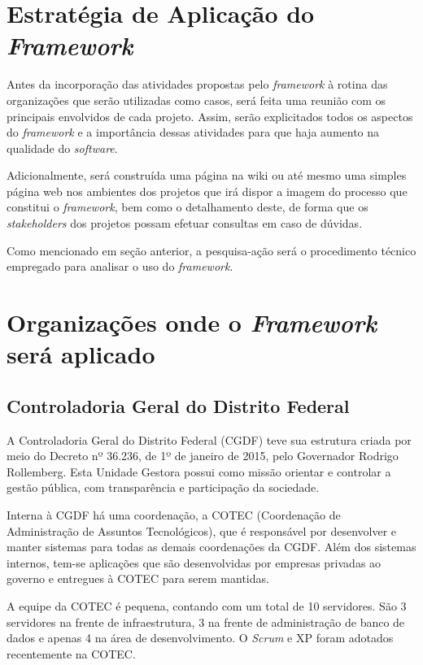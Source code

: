 \section{Estratégia de Aplicação do \textit{Framework}}

Antes da incorporação das atividades propostas pelo \textit{framework} à rotina das organizações que serão utilizadas como casos, será feita uma reunião com os principais envolvidos de cada projeto. Assim, serão explicitados todos os aspectos do \textit{framework} e a importância dessas atividades para que haja aumento na qualidade do \textit{software}.

Adicionalmente, será construída uma página na wiki ou até mesmo uma simples página web nos ambientes dos projetos que irá dispor a imagem do processo que constitui o \textit{framework}, bem como o detalhamento deste, de forma que os \textit{stakeholders} dos projetos possam efetuar consultas em caso de dúvidas.

Como mencionado em seção anterior, a pesquisa-ação será o procedimento técnico empregado para analisar o uso do \textit{framework}.

\section{Organizações onde o \textit{Framework} será aplicado}

\subsection{Controladoria Geral do Distrito Federal}

A Controladoria Geral do Distrito Federal (CGDF) teve sua estrutura criada por meio do Decreto nº 36.236, de 1º de janeiro de 2015, pelo Governador Rodrigo Rollemberg. Esta Unidade Gestora possui como missão orientar e controlar a gestão pública, com transparência e participação da sociedade.

Interna à CGDF há uma coordenação, a COTEC (Coordenação de Administração de Assuntos Tecnológicos), que é responsável por desenvolver e manter sistemas para todas as demais coordenações da CGDF. Além dos sistemas internos, tem-se aplicações que são desenvolvidas por empresas privadas ao governo e entregues à COTEC para serem mantidas.

A equipe da COTEC é pequena, contando com um total de 10 servidores. São 3 servidores na frente de infraestrutura, 3 na frente de administração de banco de dados e apenas 4 na área de desenvolvimento. O \textit{Scrum} e XP foram adotados recentemente na COTEC.

